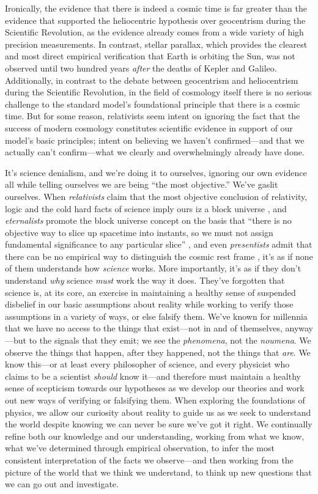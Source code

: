 \documentclass[aps,rmp,groupedaddress,twocolumn,10pt]{revtex4-2}
\begin{document}
Ironically, the evidence that there is indeed a cosmic time is far greater than the evidence that supported the heliocentric hypothesis over geocentrism during the Scientific Revolution, as the evidence already comes from a wide variety of high precision measurements. In contrast, stellar parallax, which provides the clearest and most direct empirical verification that Earth is orbiting the Sun, was not observed until two hundred years \textit{after} the deaths of Kepler and Galileo. Additionally, in contrast to the debate between geocentrism and heliocentrism during the Scientific Revolution, in the field of cosmology itself there is no serious challenge to the standard model's foundational principle that there is a cosmic time. But for some reason, relativists seem intent on ignoring the fact that the success of modern cosmology constitutes scientific evidence in support of our model's basic principles; intent on believing we haven't confirmed---and that we actually can't confirm---what we clearly and overwhelmingly already have done. 

It's science denialism, and we're doing it to ourselves, ignoring our own evidence all while telling ourselves we are being ``the most objective.'' We've gaslit ourselves. When \textit{relativists} claim that the most objective conclusion of relativity, logic and the cold hard facts of science imply ours iz a block universe \cite{Greene2004,Einstein1938}, and \textit{eternalists} promote the block universe concept on the basis that ``there is no objective way to slice up spacetime into instants, so we must not assign fundamental significance to any particular slice'' \cite{Wharton2015}, and even \textit{presentists} admit that there can be no empirical way to distinguish the cosmic rest frame \cite{Zimmerman2011}, it's as if none of them understands how \textit{science} works. More importantly, it's as if they don't understand \textit{why} science \textit{must} work the way it does. They've forgotten that science is, at its core, an exercise in maintaining a healthy sense of suspended disbelief in our basic assumptions about reality while working to verify those assumptions in a variety of ways, or else falsify them. We've known for millennia that we have no access to the things that exist---not in and of themselves, anyway---but to the signals that they emit; we see the \textit{phenomena}, not the \textit{noumena}. We observe the things that happen, after they happened, not the things that \textit{are}. We know this---or at least every philosopher of science, and every physicist who claims to be a scientist \textit{should} know it---and therefore must maintain a healthy sense of scepticism towards our hypotheses as we develop our theories and work out new ways of verifying or falsifying them. When exploring the foundations of physics, we allow our curiosity about reality to guide us as we seek to understand the world despite knowing we can never be sure we've got it right. We continually refine both our knowledge and our understanding, working from what we know, what we've determined through empirical observation, to infer the most consistent interpretation of the facts we observe---and then working from the picture of the world that we think we understand, to think up new questions that we can go out and investigate.
\end{document}
